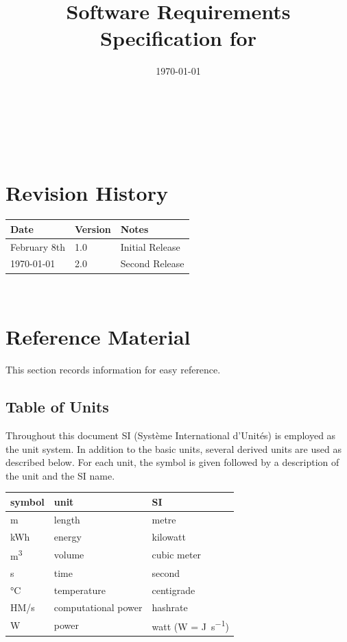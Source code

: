 \documentclass[12pt]{article}
\begin{document}
\title{Software Requirements Specification for \progname
} 
\author{\authname}
\date{\today}
	
\maketitle

~\newpage


\tableofcontents

~\newpage

\section*{Revision History}

\begin{tabularx}{\textwidth}{p{3cm}p{2cm}X}
\toprule {\bf Date} & {\bf Version} & {\bf Notes}\\
\midrule
February 8th & 1.0 & Initial Release\\
\today & 2.0 & Second Release\\
\bottomrule
\end{tabularx}

~\newpage

\section{Reference Material}

This section records information for easy reference.

\subsection{Table of Units}

Throughout this document SI (Syst\`{e}me International d'Unit\'{e}s) is employed
as the unit system.  In addition to the basic units, several derived units are
used as described below.  For each unit, the symbol is given followed by a
description of the unit and the SI name.
~\newline

\renewcommand{\arraystretch}{1.2}
  \noindent \begin{tabular}{l l l} 
    \toprule		
    \textbf{symbol} & \textbf{unit} & \textbf{SI}\\
    \midrule 
    \si{\metre} & length & metre\\
    \si{\kWh} & energy	& kilowatt\\
    \si{\m^3} & volume	& cubic meter\\
    \si{\second} & time & second\\
    \si{\celsius} & temperature & centigrade\\
    \si{HM/s} & computational power & hashrate\\
    \si{\watt} & power & watt (W = \si{\joule\per\second})\\
    \bottomrule
  \end{tabular}
\end{document}
